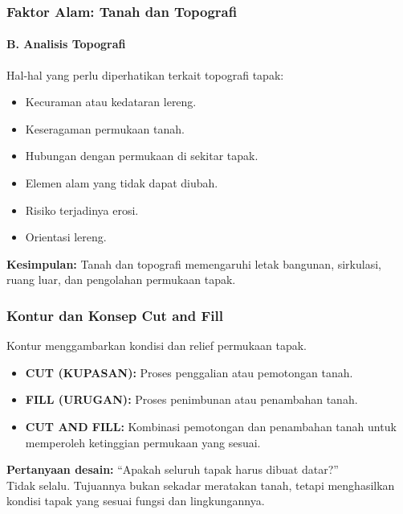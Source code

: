 \documentclass[../main.tex]{subfiles}
\begin{document}
\begin{frame}[mytitle=standard, t, mycolor=digiPH_gray, light]
	\frametitle{Faktor Alam: Tanah dan Topografi}
	\framesubtitle{B. Analisis Topografi}

	Hal-hal yang perlu diperhatikan terkait topografi tapak:
	\begin{itemize}
		\item Kecuraman atau kedataran lereng.
		\item Keseragaman permukaan tanah.
		\item Hubungan dengan permukaan di sekitar tapak.
		\item Elemen alam yang tidak dapat diubah.
		\item Risiko terjadinya erosi.
		\item Orientasi lereng.
	\end{itemize}

	\vspace{0.3cm}
	\textbf{Kesimpulan:} Tanah dan topografi memengaruhi letak bangunan, sirkulasi, ruang luar, dan pengolahan permukaan tapak.
\end{frame}

\begin{frame}[mytitle=standard, c, mycolor=digiPH_leaf, dark]
	\frametitle{Kontur dan Konsep Cut and Fill}

	Kontur menggambarkan kondisi dan relief permukaan tapak.
	\begin{itemize}
		\item \textbf{CUT (KUPASAN):} Proses penggalian atau pemotongan tanah.
		\item \textbf{FILL (URUGAN):} Proses penimbunan atau penambahan tanah.
		\item \textbf{CUT AND FILL:} Kombinasi pemotongan dan penambahan tanah untuk memperoleh ketinggian permukaan yang sesuai.
	\end{itemize}

	\vspace{0.3cm}
	\textbf{Pertanyaan desain:} ``Apakah seluruh tapak harus dibuat datar?'' \\
	Tidak selalu. Tujuannya bukan sekadar meratakan tanah, tetapi menghasilkan kondisi tapak yang sesuai fungsi dan lingkungannya.
\end{frame}
\end{document}
